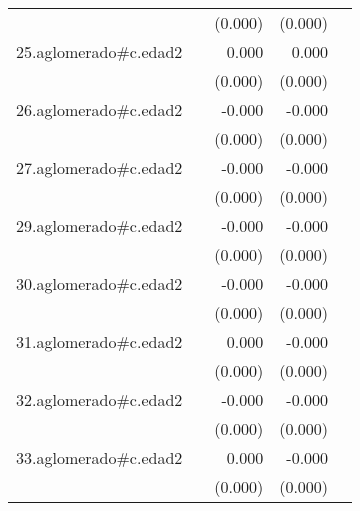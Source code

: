 {\begin{longtable}{l*{4}{D{.}{.}{-1}}}
            &                     &     (0.000)         &     (0.000)         &                     \\
\addlinespace
25.aglomerado#c.edad2&                     &       0.000         &       0.000         &                     \\
            &                     &     (0.000)         &     (0.000)         &                     \\
\addlinespace
26.aglomerado#c.edad2&                     &      -0.000         &      -0.000\sym{*}  &                     \\
            &                     &     (0.000)         &     (0.000)         &                     \\
\addlinespace
27.aglomerado#c.edad2&                     &      -0.000         &      -0.000         &                     \\
            &                     &     (0.000)         &     (0.000)         &                     \\
\addlinespace
29.aglomerado#c.edad2&                     &      -0.000         &      -0.000         &                     \\
            &                     &     (0.000)         &     (0.000)         &                     \\
\addlinespace
30.aglomerado#c.edad2&                     &      -0.000         &      -0.000\sym{**} &                     \\
            &                     &     (0.000)         &     (0.000)         &                     \\
\addlinespace
31.aglomerado#c.edad2&                     &       0.000         &      -0.000         &                     \\
            &                     &     (0.000)         &     (0.000)         &                     \\
\addlinespace
32.aglomerado#c.edad2&                     &      -0.000         &      -0.000\sym{**} &                     \\
            &                     &     (0.000)         &     (0.000)         &                     \\
\addlinespace
33.aglomerado#c.edad2&                     &       0.000         &      -0.000\sym{***}&                     \\
            &                     &     (0.000)         &     (0.000)         &                     \\

\end{longtable}}
